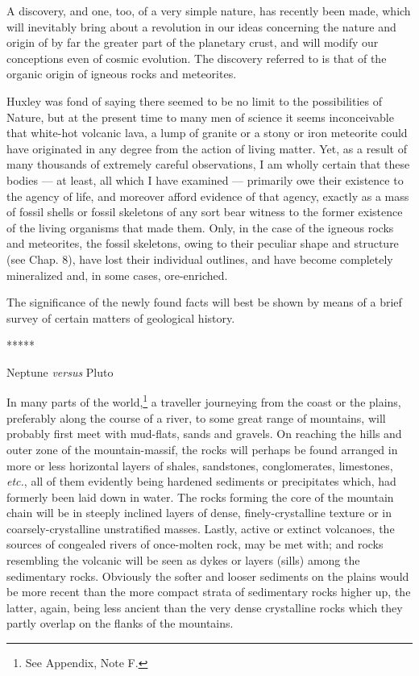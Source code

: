 \documentclass[a4paper, 12pt, oneside]{article}
\begin{document}
A discovery, and one, too, of a very simple nature, has recently been made, which will inevitably bring about a revolution in our ideas concerning the nature and origin of by far the greater part of the planetary crust, and will modify our conceptions even of cosmic evolution. The discovery referred to is that of the organic origin of igneous rocks and meteorites.

Huxley was fond of saying there seemed to be no limit to the possibilities of Nature, but at the present time to many men of science it seems inconceivable that white-hot volcanic lava, a lump of granite or a stony or iron meteorite could have originated in any degree from the action of living matter. Yet, as a result of many thousands of extremely careful observations, I am wholly certain that these bodies --- at least, all which I have examined --- primarily owe their existence to the agency of life, and moreover afford evidence of that agency, exactly as a mass of fossil shells or fossil skeletons of any sort bear witness to the former existence of the living organisms that made them. Only, in the case of the igneous rocks and meteorites, the fossil skeletons, owing to their peculiar shape and structure (see Chap. 8), have lost their individual outlines, and have become completely mineralized and, in some cases, ore-enriched.

The significance of the newly found facts will best be shown by means of a brief survey of certain matters of geological history.

\centerline{*\hspace{15mm}*\hspace{15mm}*\hspace{15mm}*\hspace{15mm}*}
\bigskip

\centerline{Neptune \emph{versus} Pluto}

In many parts of the world,\footnote{See Appendix, Note F.} a traveller journeying from the coast or the plains, preferably along the course of a river, to some great range of mountains, will probably first meet with mud-flats, sands and gravels. On reaching the hills and outer zone of the mountain-massif, the rocks will perhaps be found arranged in more or less horizontal layers of shales, sandstones, conglomerates, limestones, \emph{etc.}, all of them evidently being hardened sediments or precipitates which, had formerly been laid down in water. The rocks forming the core of the mountain chain will be in steeply inclined layers of dense, finely-crystalline texture or in coarsely-crystalline unstratified masses. Lastly, active or extinct volcanoes, the sources of congealed rivers of once-molten rock, may be met with; and rocks resembling the volcanic will be seen as dykes or layers (sills) among the sedimentary rocks. Obviously the softer and looser sediments on the plains would be more recent than the more compact strata of sedimentary rocks higher up, the latter, again, being less ancient than the very dense crystalline rocks which they partly overlap on the flanks of the mountains.
\end{document}
